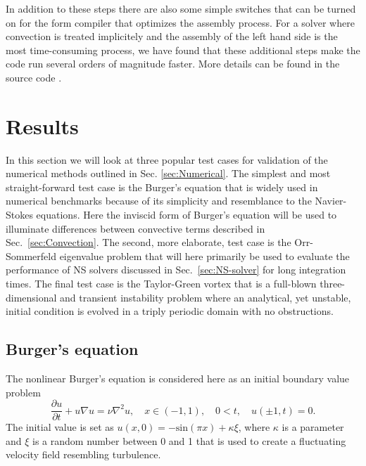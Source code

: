 In addition to these steps there are also some simple switches that can be turned on for the form compiler that optimizes the assembly process. For a solver where convection is treated implicitely and the assembly of the left hand side is the most time-consuming process, we have found that these additional steps make the code run several orders of magnitude faster. More details can be found in the source code \cite{folder}.

\section{Results}
\label{sec:testcases}
In this section we will look at three popular test cases for validation of the numerical methods outlined in Sec. \ref{sec:Numerical}. The simplest and most straight-forward test case is the Burger's equation that is widely used in numerical benchmarks because of its simplicity and resemblance to the Navier-Stokes equations. Here the inviscid form of Burger's equation will be used to illuminate differences between convective terms described in Sec.~\ref{sec:Convection}. The second, more elaborate, test case is the Orr-Sommerfeld eigenvalue problem that will here primarily be used to evaluate the performance of NS solvers discussed in Sec.~\ref{sec:NS-solver} for long integration times. The final test case is the Taylor-Green vortex that is a full-blown three-dimensional and transient instability problem where an analytical, yet unstable, initial condition is evolved in a triply periodic domain with no obstructions.

\subsection{Burger's equation}
\label{sec:burgers}
The nonlinear Burger's equation is considered here as an initial boundary value problem
\begin{equation}
 \frac{\partial u}{\partial t}+u\nabla u = \nu \nabla^2 u, \quad x \in (-1,1), \quad 0<t, \quad u(\pm 1,t)=0.
\label{eq:burgers}
\end{equation}
The initial value is set as $u(x,0)=-\text{sin}(\pi x)+\kappa \xi$, where $\kappa$ is a parameter and $\xi$ is a random number between 0 and 1 that is used to create a fluctuating velocity field resembling turbulence. %

